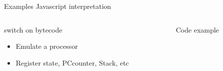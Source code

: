 %
\begin{Frame}{Examples Javascript interpretation}
  \begin{columns}[t]
    \begin{column}{\BW} %
      \begin{block}{switch on bytecode}
        \begin{itemize}
        \item Emulate a processor
        \item Register state, PCcounter, Stack, etc

        \end{itemize}
      \end{block} 
    \end{column}
    
    \begin{column}{\BW} %
      \begin{block}{Code example}\tiny
        
      \end{block}   
    \end{column}
  \end{columns}  
\end{Frame}


